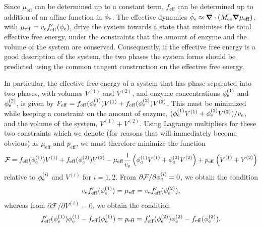 Since $\mu_\mathrm{eff}$ can be determined up to a constant term, $f_\mathrm{eff}$ can be determined up to addition of an affine function in $\phi_{\mathrm{e}}$. The effective dynamics $\dot{\phi_{\mathrm{e}}}\approx \bm{\nabla} \cdot (M_{\mathrm{ee}}\bm{\nabla}\mu_\mathrm{eff})$, with $\mu_\mathrm{eff}=v_{\mathrm{e}} f'_\mathrm{eff}(\phi_{\mathrm{e}})$, drive the system towards a state that minimises the total effective free energy, under the constraints that the amount of enzyme and the volume of the system are conserved. Consequently, if the effective free energy is a good description of the system, the two phases the system forms should be predicted using the common tangent construction on the effective free energy.

In particular, the effective free energy of a system that has phase separated into two phases, with volumes $V^{(1)}$ and $V^{(2)}$, and enzyme concentrations $\phi_{\mathrm{e}}^{(1)}$ and $\phi_{\mathrm{e}}^{(2)}$, is given by $F_\mathrm{eff}=f_\mathrm{eff}(\phi_{\mathrm{e}}^{(1)})V^{(1)}+f_\mathrm{eff}(\phi_{\mathrm{e}}^{(2)})V^{(2)}$. This must be minimized while keeping a constraint on the amount of enzyme, $(\phi_{\mathrm{e}}^{(1)}V^{(1)}+\phi_{\mathrm{e}}^{(2)}V^{(2)})/v_{\mathrm{e}}$, and the volume of the system, $V^{(1)}+V^{(2)}$. Using Lagrange multipliers for these two constraints which we denote (for reasons that will immediately become obvious) as $\mu_\mathrm{eff}$ and $p_\mathrm{eff}$, we must therefore minimize the function
\begin{equation}
    \mathcal{F}=f_\mathrm{eff}(\phi_{\mathrm{e}}^{(1)})V^{(1)}+f_\mathrm{eff}(\phi_{\mathrm{e}}^{(2)})V^{(2)} - \mu_\mathrm{eff} \frac{1}{v_{\mathrm{e}}} \left( \phi_{\mathrm{e}}^{(1)}V^{(1)}+\phi_{\mathrm{e}}^{(2)}V^{(2)} \right) + p_\mathrm{eff} \left( V^{(1)}+V^{(2)} \right)
\end{equation}
relative to $\phi_{\mathrm{e}}^{(i)}$ and $V^{(i)}$ for $i=1,2$. From $\partial \mathcal{F}/\partial\phi_{\mathrm{e}}^{(i)}=0$, we obtain the condition
\begin{equation}
    v_{\mathrm{e}} f'_\mathrm{eff}(\phi_{\mathrm{e}}^{(1)}) = \mu_\mathrm{eff} = v_{\mathrm{e}} f'_\mathrm{eff}(\phi_{\mathrm{e}}^{(2)}) ,\label{eq:equalmu}
\end{equation}
whereas from $\partial \mathcal{F}/\partial V^{(i)}=0$, we obtain the condition
\begin{equation}
     f'_\mathrm{eff}(\phi_{\mathrm{e}}^{(1)})\phi_{\mathrm{e}}^{(1)} - f_\mathrm{eff}(\phi_{\mathrm{e}}^{(1)}) = p_\mathrm{eff} = f'_\mathrm{eff}(\phi_{\mathrm{e}}^{(2)})\phi_{\mathrm{e}}^{(2)} - f_\mathrm{eff}(\phi_{\mathrm{e}}^{(2)}). \label{eq:equalp}
\end{equation}

